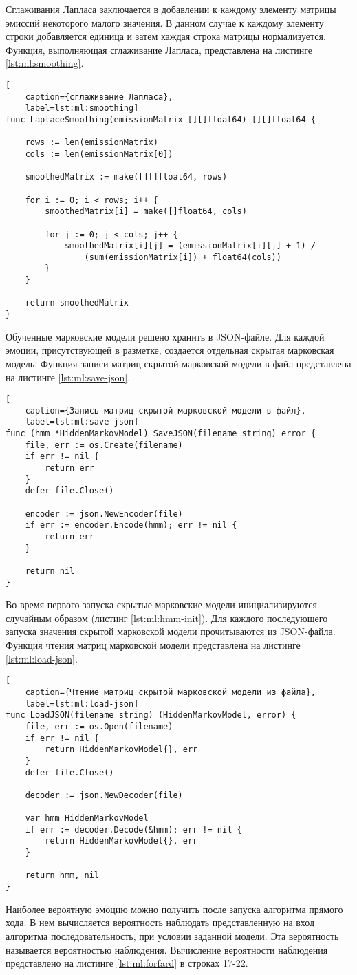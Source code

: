 Сглаживания Лапласа заключается в добавлении к каждому элементу матрицы эмиссий некоторого малого значения. В данном случае к каждому элементу строки добавляется единица и затем каждая строка матрицы нормализуется. Функция, выполняющая сглаживание Лапласа, представлена на листинге \ref{lst:ml:smoothing}.
\begin{lstlisting}[
	caption={сглаживание Лапласа},
	label=lst:ml:smoothing]
func LaplaceSmoothing(emissionMatrix [][]float64) [][]float64 {
	
	rows := len(emissionMatrix)
	cols := len(emissionMatrix[0])
	
	smoothedMatrix := make([][]float64, rows)
	
	for i := 0; i < rows; i++ {
		smoothedMatrix[i] = make([]float64, cols)
		
		for j := 0; j < cols; j++ {
			smoothedMatrix[i][j] = (emissionMatrix[i][j] + 1) /
				(sum(emissionMatrix[i]) + float64(cols))
		}
	}

	return smoothedMatrix
}
\end{lstlisting}
Обученные марковские модели решено хранить в JSON-файле. Для каждой эмоции, присутствующей в разметке, создается отдельная скрытая марковская модель. Функция записи матриц скрытой марковской модели в файл представлена на листинге \ref{lst:ml:save-json}.
\begin{lstlisting}[
	caption={Запись матриц скрытой марковской модели в файл},
	label=lst:ml:save-json]
func (hmm *HiddenMarkovModel) SaveJSON(filename string) error {
	file, err := os.Create(filename)
	if err != nil {
		return err
	}
	defer file.Close()
	
	encoder := json.NewEncoder(file)
	if err := encoder.Encode(hmm); err != nil {
		return err
	}
	
	return nil
}
\end{lstlisting}

Во время первого запуска скрытые марковские модели инициализируются случайным образом (листинг \ref{lst:ml:hmm-init}). Для каждого последующего запуска значения скрытой марковской модели прочитываются из JSON-файла. Функция чтения матриц марковской модели представлена на листинге \ref{lst:ml:load-json}.
\begin{lstlisting}[
	caption={Чтение матриц скрытой марковской модели из файла},
	label=lst:ml:load-json]
func LoadJSON(filename string) (HiddenMarkovModel, error) {
	file, err := os.Open(filename)
	if err != nil {
		return HiddenMarkovModel{}, err
	}
	defer file.Close()

	decoder := json.NewDecoder(file)
	
	var hmm HiddenMarkovModel
	if err := decoder.Decode(&hmm); err != nil {
		return HiddenMarkovModel{}, err
	}
	
	return hmm, nil
}
\end{lstlisting}
Наиболее вероятную эмоцию можно получить после запуска алгоритма прямого хода. В нем вычисляется вероятность наблюдать представленную на вход алгоритма последовательность, при условии заданной модели. Эта вероятность называется вероятностью наблюдения. Вычисление вероятности наблюдения представлено на листинге \ref{lst:ml:forfard} в строках 17-22.

